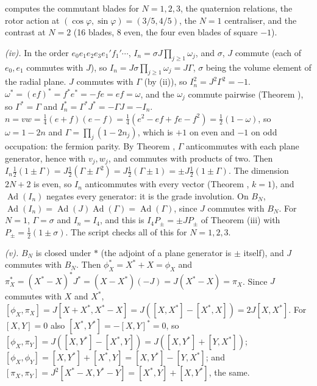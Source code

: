 computes the commutant blades for $N = 1, 2, 3$, the quaternion relations, the rotor action at $(\cos\varphi, \sin\varphi) = (3/5, 4/5)$, the $N = 1$ centraliser, and the contrast at $N = 2$ (16 blades, 8 even, the four even blades of square $-1$).

\emph{(iv).} In the order $e_{0}e_{1}e_{2}e_{3}e_{1}'f_{1}'\cdots$, $I_{n} = \sigma J\prod_{j \ge 1}\omega_{j}$, and $\sigma$, $J$ commute (each of $e_{0}, e_{1}$ commutes with $J$), so $I_{n} = J\sigma\prod_{j \ge 1}\omega_{j} = J\Gamma$, $\sigma$ being the volume element of the radial plane. $J$ commutes with $\Gamma$ (by (ii)), so $I_{n}^{2} = J^{2}\Gamma^{2} = -1$. $\omega^{*} = (ef)^{*} = f^{*}e^{*} = -fe = ef = \omega$, and the $\omega_{j}$ commute pairwise (Theorem ), so $\Gamma^{*} = \Gamma$ and $I_{n}^{*} = \Gamma^{*}J^{*} = -\Gamma J = -I_{n}$. $n = vw = \tfrac14(e + f)(e - f) = \tfrac14(e^{2} - ef + fe - f^{2}) = \tfrac12(1 - \omega)$, so $\omega = 1 - 2n$ and $\Gamma = \prod_{j}(1 - 2n_{j})$, which is $+1$ on even and $-1$ on odd occupation: the fermion parity. By Theorem , $\Gamma$ anticommutes with each plane generator, hence with $v_{j}, w_{j}$, and commutes with products of two. Then $I_{n}\tfrac12(1 \pm \Gamma) = J\tfrac12(\Gamma \pm \Gamma^{2}) = J\tfrac12(\Gamma \pm 1) = \pm J\tfrac12(1 \pm \Gamma)$. The dimension $2N + 2$ is even, so $I_{n}$ anticommutes with every vector (Theorem , $k = 1$), and $\operatorname{Ad}(I_{n})$ negates every generator: it is the grade involution. On $B_{N}$, $\operatorname{Ad}(I_{n}) = \operatorname{Ad}(J)\operatorname{Ad}(\Gamma) = \operatorname{Ad}(\Gamma)$, since $J$ commutes with $B_{N}$. For $N = 1$, $\Gamma = \sigma$ and $I_{n} = I_{4}$, and this is $I_{4}P_{\pm} = \pm JP_{\pm}$ of Theorem (iii) with $P_{\pm} = \tfrac12(1 \pm \sigma)$. The script checks all of this for $N = 1, 2, 3$.

\emph{(v).} $B_{N}$ is closed under $*$ (the adjoint of a plane generator is $\pm$ itself), and $J$ commutes with $B_{N}$. Then $\phi_{X}^{*} = X^{*} + X = \phi_{X}$ and $\pi_{X}^{*} = (X^{*} - X)^{*}J^{*} = (X - X^{*})(-J) = J(X^{*} - X) = \pi_{X}$. Since $J$ commutes with $X$ and $X^{*}$, $[\phi_{X}, \pi_{X}] = J[X + X^{*}, X^{*} - X] = J([X, X^{*}] - [X^{*}, X]) = 2J[X, X^{*}]$. For $[X, Y] = 0$ also $[X^{*}, Y^{*}] = -[X, Y]^{*} = 0$, so $[\phi_{X}, \pi_{Y}] = J([X, Y^{*}] - [X^{*}, Y]) = J([X, Y^{*}] + [Y, X^{*}])$; $[\phi_{X}, \phi_{Y}] = [X, Y^{*}] + [X^{*}, Y] = [X, Y^{*}] - [Y, X^{*}]$; and $[\pi_{X}, \pi_{Y}] = J^{2}[X^{*} - X, Y^{*} - Y] = [X^{*}, Y] + [X, Y^{*}]$, the same.

